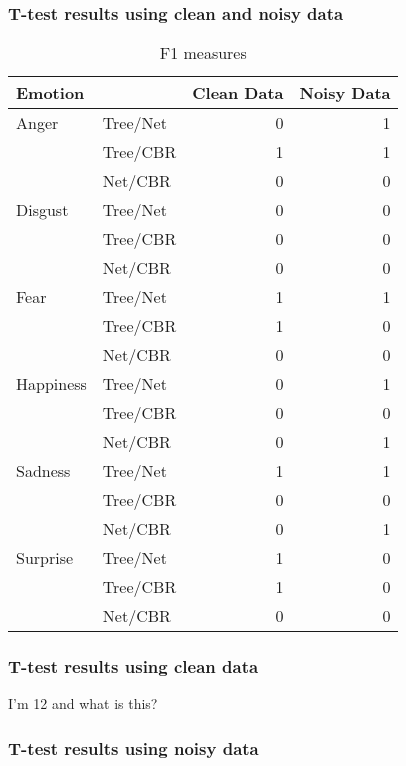 \documentclass[12pt]{article}
\begin{document}
\subsubsection*{T-test results using clean and noisy data}
\begin{table}[h]
\centering
\begin{tabular}{l l | r r}
Emotion   &          & Clean Data & Noisy Data \\
\hline
Anger     & Tree/Net & 0          & 1          \\
          & Tree/CBR & 1          & 1          \\
          & Net/CBR  & 0          & 0          \\
Disgust   & Tree/Net & 0          & 0          \\
          & Tree/CBR & 0          & 0          \\
          & Net/CBR  & 0          & 0          \\
Fear      & Tree/Net & 1          & 1          \\
          & Tree/CBR & 1          & 0          \\
          & Net/CBR  & 0          & 0          \\
Happiness & Tree/Net & 0          & 1          \\
          & Tree/CBR & 0          & 0          \\
          & Net/CBR  & 0          & 1          \\
Sadness   & Tree/Net & 1          & 1          \\
          & Tree/CBR & 0          & 0          \\
          & Net/CBR  & 0          & 1          \\
Surprise  & Tree/Net & 1          & 0          \\
          & Tree/CBR & 1          & 0          \\
          & Net/CBR  & 0          & 0          \\
\end{tabular}
\caption{F1 measures}
\end{table}

\subsubsection*{T-test results using clean data}

I'm 12 and what is this?

\subsubsection*{T-test results using noisy data}
\end{document}
